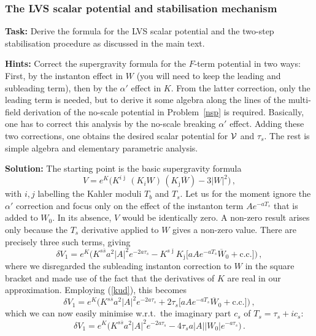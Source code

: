 \documentclass[12pt]{article}
\newcommand{\be}{\begin{equation}}
\newcommand{\ee}{\end{equation}}
\newcommand{\ol}{\overline}
\numberwithin{equation}{section}
\begin{document}
\subsubsection{The LVS scalar potential and stabilisation mechanism}\label{lvsd}

{\bf Task:}
Derive the formula for the LVS scalar potential and the two-step stabilisation procedure as discussed in the main text.

\noindent
{\bf Hints:} Correct the supergravity formula for the $F$-term potential in two ways: First, by the instanton effect in $W$ (you will need to keep the leading and subleading term), then by the $\alpha'$ effect in $K$. From the latter correction, only the leading term is needed, but to derive it some algebra along the lines of the multi-field derivation of the no-scale potential in Problem~\ref{nsp} is required. Basically, one has to correct this analysis by the no-scale breaking $\alpha'$ effect. Adding these two corrections, one obtains the desired scalar potential for ${\cal V}$ and $\tau_s$. The rest is simple algebra and elementary parametric analysis.

\noindent
{\bf Solution:}
The starting point is the basic supergravity formula 
\be
V=e^K\Big(K^{i\ol{\jmath}}\,(K_i W) \, (K_{\ol{\jmath}} \ol{W} )-3|W|^2\Big)\,,
\ee
with $i,j$ labelling the Kahler moduli $T_b$ and $T_s$. Let us for the moment ignore the $\alpha'$ correction and focus only on the effect of the instanton term $A e^{-aT_s}$ that is added to $W_0$. In its absence, $V$ would be identically zero. A non-zero result arises only because the $T_s$ derivative applied to $W$ gives a non-zero value. There are precisely three such terms, giving
\be
\delta V_1=e^K\Big(K^{s\ol{s}}a^2|A|^2 e^{-2a\tau_s}
-K^{s\ol{\jmath}}K_{\ol{\jmath}}\big[aAe^{-aT_s}\ol{W}_0+\mbox{c.c.}\big] \Big)\,,
\ee
where we disregarded the subleading instanton correction to $W$ in the square bracket and made use of the fact that the derivatives of $K$ are real in our approximation. Employing (\ref{kud}), this becomes
\be
\delta V_1=e^K\Big(K^{s\ol{s}}a^2|A|^2 e^{-2a\tau_s}
+2\tau_s\big[aAe^{-aT_s}\ol{W}_0+\mbox{c.c.}\big] \Big)\,,
\ee
which we can now easily minimise w.r.t.~the imaginary part $c_s$ of $T_s=\tau_s+ic_s$:
\be
\delta V_1=e^K\Big(K^{s\ol{s}}a^2|A|^2 e^{-2a\tau_s}
-4\tau_s a |A||W_0| e^{-a\tau_s}\Big)\,.
\ee
\end{document}
